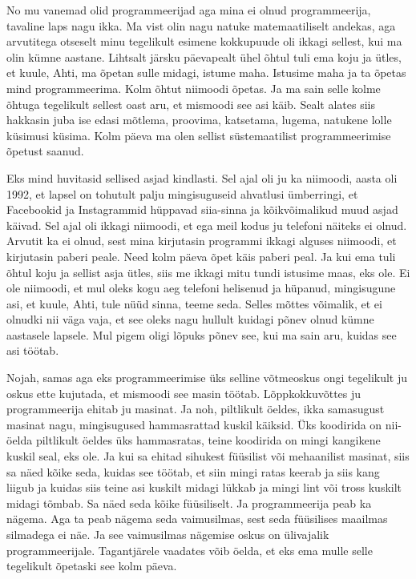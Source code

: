 
No mu vanemad olid programmeerijad aga mina ei olnud programmeerija, tavaline 
laps nagu ikka. Ma vist olin nagu natuke  matemaatiliselt  andekas, aga 
arvutitega otseselt minu tegelikult esimene kokkupuude oli ikkagi sellest, kui 
ma olin kümne aastane. Lihtsalt järsku päevapealt  ühel õhtul tuli ema  koju ja 
ütles, et kuule, Ahti,  ma õpetan sulle midagi, istume maha. Istusime maha ja 
ta õpetas mind programmeerima. Kolm õhtut niimoodi õpetas. Ja ma sain selle 
kolme õhtuga tegelikult sellest oast aru, et mismoodi see asi käib. Sealt 
alates  siis hakkasin juba ise edasi mõtlema, proovima, katsetama, lugema, 
natukene lolle küsimusi küsima. Kolm päeva ma olen sellist süstemaatilist 
programmeerimise õpetust saanud.


Eks mind huvitasid sellised asjad kindlasti. Sel ajal oli ju ka niimoodi,  
aasta oli 1992, et  lapsel on tohutult palju mingisuguseid ahvatlusi 
ümberringi, et Facebookid ja Instagrammid hüppavad siia-sinna ja kõikvõimalikud 
muud asjad käivad. Sel ajal oli ikkagi niimoodi, et ega meil kodus ju telefoni 
näiteks ei olnud. Arvutit ka ei olnud, sest mina kirjutasin programmi ikkagi 
alguses niimoodi, et kirjutasin paberi peale. Need kolm päeva õpet käis paberi 
peal. Ja kui  ema tuli õhtul koju ja sellist asja ütles, siis me ikkagi mitu 
tundi istusime maas, eks ole. Ei ole niimoodi, et mul oleks kogu aeg telefoni 
helisenud ja hüpanud, mingisugune asi, et kuule, Ahti, tule nüüd sinna, teeme 
seda. Selles mõttes võimalik, et ei olnudki nii väga vaja, et see oleks nagu 
hullult kuidagi põnev olnud kümne aastasele lapsele. Mul pigem oligi lõpuks  
põnev see, kui ma sain aru, kuidas see asi töötab.


Nojah, samas aga eks programmeerimise üks selline  võtmeoskus ongi tegelikult 
ju oskus ette kujutada, et mismoodi see masin  töötab. Lõppkokkuvõttes ju 
programmeerija ehitab ju masinat. Ja noh, piltlikult öeldes, ikka samasugust 
masinat nagu,  mingisugused hammasrattad kuskil käiksid. Üks koodirida on 
nii-öelda piltlikult öeldes üks hammasratas, teine koodirida on mingi kangikene 
kuskil seal, eks ole. Ja kui sa ehitad sihukest füüsilist või mehaanilist 
masinat, siis sa näed kõike seda, kuidas see töötab, et siin mingi ratas keerab 
ja siis kang liigub ja kuidas siis teine asi kuskilt midagi lükkab ja mingi 
lint või tross kuskilt midagi tõmbab. Sa näed seda kõike füüsiliselt. Ja 
programmeerija peab ka nägema. Aga ta peab nägema seda vaimusilmas, sest seda  
füüsilises maailmas  silmadega ei näe. Ja see vaimusilmas nägemise oskus on 
ülivajalik programmeerijale. Tagantjärele vaadates võib öelda, et eks ema mulle 
selle tegelikult õpetaski  see kolm päeva.

